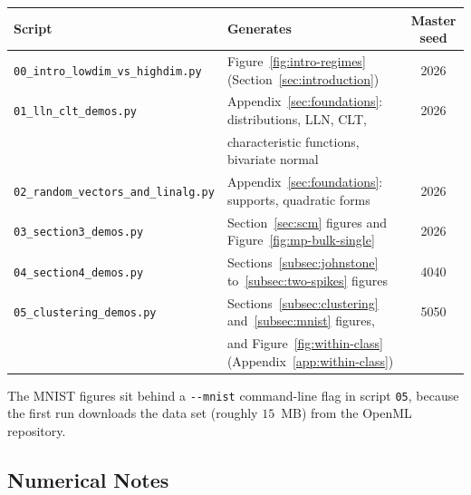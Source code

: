 \begin{center}
\begin{tabular}{l l c}
\hline
Script & Generates & Master seed \\
\hline
\texttt{00\_intro\_lowdim\_vs\_highdim.py} & Figure~\ref{fig:intro-regimes} (Section~\ref{sec:introduction}) & 2026 \\
\texttt{01\_lln\_clt\_demos.py} & Appendix~\ref{sec:foundations}: distributions, LLN, CLT, & 2026 \\
 & characteristic functions, bivariate normal & \\
\texttt{02\_random\_vectors\_and\_linalg.py} & Appendix~\ref{sec:foundations}: supports, quadratic forms & 2026 \\
\texttt{03\_section3\_demos.py} & Section~\ref{sec:scm} figures and Figure~\ref{fig:mp-bulk-single} & 2026 \\
\texttt{04\_section4\_demos.py} & Sections~\ref{subsec:johnstone} to~\ref{subsec:two-spikes} figures & 4040 \\
\texttt{05\_clustering\_demos.py} & Sections~\ref{subsec:clustering} and~\ref{subsec:mnist} figures, & 5050 \\
 & and Figure~\ref{fig:within-class} (Appendix~\ref{app:within-class}) & \\
\hline
\end{tabular}
\end{center}

\medskip

The MNIST figures sit behind a \texttt{-{}-mnist} command-line flag in script \texttt{05}, because the first run downloads the data set (roughly \(15\)~MB) from the OpenML repository.

\subsection{Numerical Notes}\label{app:numerical-notes}

